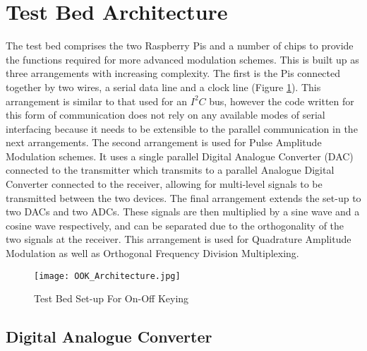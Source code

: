 \documentclass[../main.tex]{subfiles}
\begin{document}
\section{Test Bed Architecture}


The test bed comprises the two Raspberry Pis and a number of chips to provide the functions required for more advanced modulation schemes.
This is built up as three arrangements with increasing complexity.
The first is the Pis connected together by two wires, a serial data line and a clock line (Figure \ref{fig_OOK Architecture}).
This arrangement is similar to that used for an $I^2C$ bus, however the code written for this form of communication does not rely on any available modes of serial interfacing because it needs to be extensible to the parallel communication in the next arrangements.
The second arrangement is used for Pulse Amplitude Modulation schemes.
It uses a single parallel Digital Analogue Converter (DAC) connected to the transmitter which transmits to a parallel Analogue Digital Converter connected to the receiver, allowing for multi-level signals to be transmitted between the two devices.
The final arrangement extends the set-up to two DACs and two ADCs.
These signals are then multiplied by a sine wave and a cosine wave respectively, and can be separated due to the orthogonality of the two signals at the receiver.
This arrangement is used for Quadrature Amplitude Modulation as well as Orthogonal Frequency Division Multiplexing.\\

\begin{figure}[ht]
	\centering
	\texttt{[image: OOK\_Architecture.jpg]}
	\caption{Test Bed Set-up For On-Off Keying}
	\label{fig_OOK Architecture}
\end{figure}

\subsection{Digital Analogue Converter}
\end{document}
